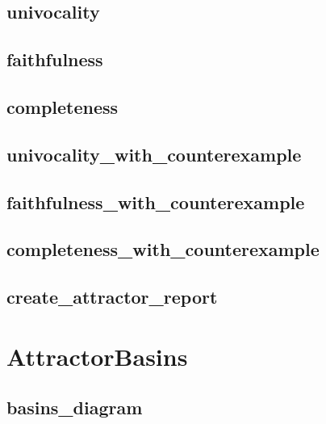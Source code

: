 \documentclass[letterpaper,10pt,english]{sphinxmanual}
\begin{document}
\subsection{univocality}
\label{AttractorDetection:univocality}\label{AttractorDetection:id4}

\subsection{faithfulness}
\label{AttractorDetection:id5}\label{AttractorDetection:faithfulness}

\subsection{completeness}
\label{AttractorDetection:id6}\label{AttractorDetection:completeness}

\subsection{univocality\_with\_counterexample}
\label{AttractorDetection:id7}\label{AttractorDetection:univocality-with-counterexample}

\subsection{faithfulness\_with\_counterexample}
\label{AttractorDetection:faithfulness-with-counterexample}\label{AttractorDetection:id8}

\subsection{completeness\_with\_counterexample}
\label{AttractorDetection:completeness-with-counterexample}\label{AttractorDetection:id9}

\subsection{create\_attractor\_report}
\label{AttractorDetection:id10}\label{AttractorDetection:create-attractor-report}

\section{AttractorBasins}
\label{AttractorBasins:attractorbasins}\label{AttractorBasins::doc}\label{AttractorBasins:id1}

\subsection{basins\_diagram}
\label{AttractorBasins:id2}\label{AttractorBasins:basins-diagram}
\end{document}
